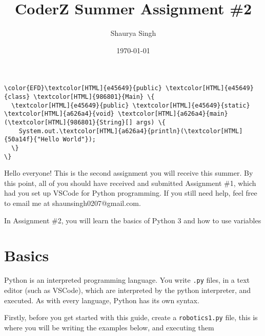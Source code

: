 \documentclass{scrartcl}
\author{Shaurya Singh}
\date{\today}
\title{CoderZ Summer Assignment \#2}
\begin{document}
\maketitle
\setcounter{tocdepth}{2}
\tableofcontents

\begin{Code}
\begin{Verbatim}[]
\color{EFD}\textcolor[HTML]{e45649}{public} \textcolor[HTML]{e45649}{class} \textcolor[HTML]{986801}{Main} \{
  \textcolor[HTML]{e45649}{public} \textcolor[HTML]{e45649}{static} \textcolor[HTML]{a626a4}{void} \textcolor[HTML]{a626a4}{main}(\textcolor[HTML]{986801}{String}[] args) \{
    System.out.\textcolor[HTML]{a626a4}{println}(\textcolor[HTML]{50a14f}{"Hello World"});
  \}
\}
\end{Verbatim}
\end{Code}

Hello everyone! This is the second assignment you will receive this summer. By this
point, all of you should have received and submitted Assignment \#1, which had
you set up VSCode for Python programming. If you still need help, feel free to
email me at shaunsingh0207@gmail.com.

In Assignment \#2, you will learn the basics of Python 3 and how to use variables

\section{Basics}
\label{sec:orgdd2e36f}
Python is an interpreted programming language. You write \texttt{.py} files, in a text
editor (such as VSCode), which are interpreted by the python interpreter, and
executed. As with every language, Python has its own syntax.

Firstly, before you get started with this guide, create a \texttt{robotics1.py} file,
this is where you will be writing the examples below, and executing them
\end{document}
